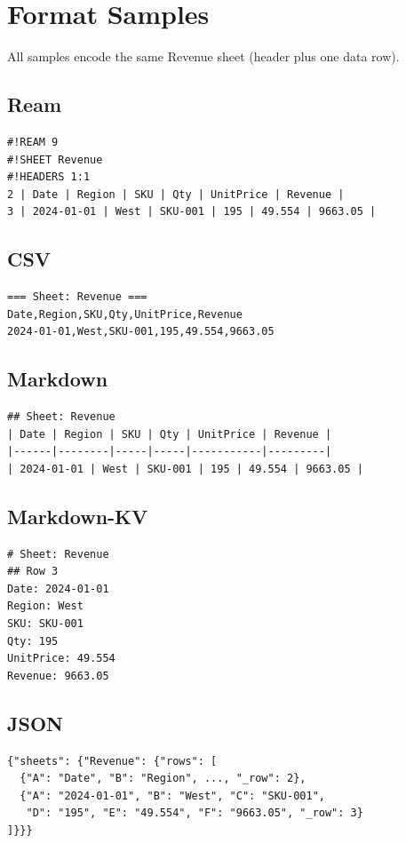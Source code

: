 \documentclass[11pt]{article}
\begin{document}
\appendix
\section{Format Samples}
\label{app:samples}

All samples encode the same Revenue sheet (header plus one data row).

\subsection{Ream}
\begin{lstlisting}
#!REAM 9
#!SHEET Revenue
#!HEADERS 1:1
2 | Date | Region | SKU | Qty | UnitPrice | Revenue |
3 | 2024-01-01 | West | SKU-001 | 195 | 49.554 | 9663.05 |
\end{lstlisting}

\subsection{CSV}
\begin{lstlisting}
=== Sheet: Revenue ===
Date,Region,SKU,Qty,UnitPrice,Revenue
2024-01-01,West,SKU-001,195,49.554,9663.05
\end{lstlisting}

\subsection{Markdown}
\begin{lstlisting}
## Sheet: Revenue
| Date | Region | SKU | Qty | UnitPrice | Revenue |
|------|--------|-----|-----|-----------|---------|
| 2024-01-01 | West | SKU-001 | 195 | 49.554 | 9663.05 |
\end{lstlisting}

\subsection{Markdown-KV}
\begin{lstlisting}
# Sheet: Revenue
## Row 3
Date: 2024-01-01
Region: West
SKU: SKU-001
Qty: 195
UnitPrice: 49.554
Revenue: 9663.05
\end{lstlisting}

\subsection{JSON}
\begin{lstlisting}
{"sheets": {"Revenue": {"rows": [
  {"A": "Date", "B": "Region", ..., "_row": 2},
  {"A": "2024-01-01", "B": "West", "C": "SKU-001",
   "D": "195", "E": "49.554", "F": "9663.05", "_row": 3}
]}}}
\end{lstlisting}
\end{document}
